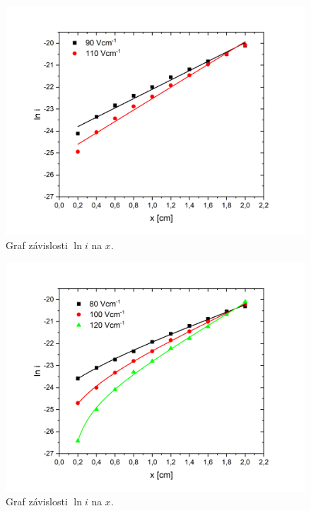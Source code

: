 \documentclass[a4paper,12pt]{article}
\begin{document}
\begin{figure}[h!]
	\centering
	\includegraphics[width=145mm]{lni90-110.png}
	\caption{Graf závislosti $\ln i$ na $x$.}
	\label{lni90-110}
\end{figure}

\begin{figure}[h!]
	\centering
	\includegraphics[width=145mm]{iposun80-120.png}
	\caption{Graf závislosti $\ln i$ na $x$.}
	\label{iposun80-120}
\end{figure}
\end{document}
